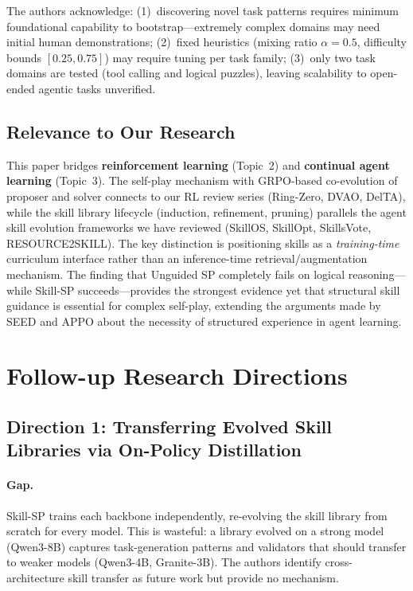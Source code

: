 \documentclass[11pt,a4paper]{article}
\begin{document}
The authors acknowledge: (1)~discovering novel task patterns requires minimum foundational capability to bootstrap---extremely complex domains may need initial human demonstrations; (2)~fixed heuristics (mixing ratio $\alpha = 0.5$, difficulty bounds $[0.25, 0.75]$) may require tuning per task family; (3)~only two task domains are tested (tool calling and logical puzzles), leaving scalability to open-ended agentic tasks unverified.

\subsection{Relevance to Our Research}

This paper bridges \textbf{reinforcement learning} (Topic~2) and \textbf{continual agent learning} (Topic~3). The self-play mechanism with GRPO-based co-evolution of proposer and solver connects to our RL review series (Ring-Zero, DVAO, DelTA), while the skill library lifecycle (induction, refinement, pruning) parallels the agent skill evolution frameworks we have reviewed (SkillOS, SkillOpt, SkillsVote, RESOURCE2SKILL). The key distinction is positioning skills as a \emph{training-time} curriculum interface rather than an inference-time retrieval/augmentation mechanism. The finding that Unguided SP completely fails on logical reasoning---while Skill-SP succeeds---provides the strongest evidence yet that structural skill guidance is essential for complex self-play, extending the arguments made by SEED and APPO about the necessity of structured experience in agent learning.

\section{Follow-up Research Directions}

\subsection{Direction 1: Transferring Evolved Skill Libraries via On-Policy Distillation}

\paragraph{Gap.}
Skill-SP trains each backbone independently, re-evolving the skill library from scratch for every model. This is wasteful: a library evolved on a strong model (Qwen3-8B) captures task-generation patterns and validators that should transfer to weaker models (Qwen3-4B, Granite-3B). The authors identify cross-architecture skill transfer as future work but provide no mechanism.
\end{document}
